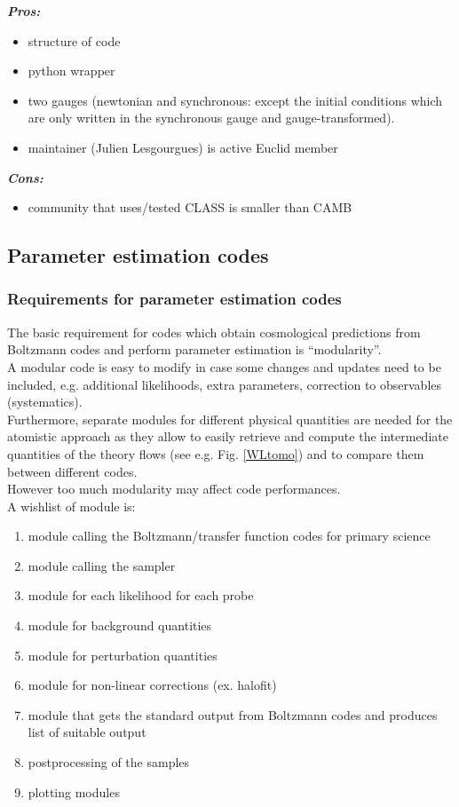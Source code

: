 {\it \bf Pros: }
\begin{itemize}
 \item structure of code
 \item python wrapper
 \item two gauges (newtonian and synchronous: except the initial conditions which are only written in the synchronous gauge and gauge-transformed). 
 \item maintainer (Julien Lesgourgues) is active Euclid member
\end{itemize}

{\it \bf Cons: }
\begin{itemize}
 \item community that uses/tested CLASS is smaller than CAMB
\end{itemize}


\newpage
\subsection{Parameter estimation codes}

\subsubsection{Requirements for parameter estimation codes}

The basic requirement for codes which obtain cosmological predictions from Boltzmann codes and perform parameter estimation is ``modularity''.\\
A modular code is easy to modify in case some changes and updates need to be included, e.g. additional likelihoods, extra parameters, correction to observables (systematics).\\
Furthermore, separate modules for different physical quantities are needed for the atomistic approach as they allow to easily retrieve and compute the intermediate quantities of the theory
flows (see e.g. Fig. \ref{WLtomo}) and to compare them between different codes.\\
However too much modularity may affect code performances.\\

A wishlist of module is:
\begin{enumerate}
 \item module calling the Boltzmann/transfer function codes for primary science
 \item module calling the sampler
 \item module for each likelihood for each probe
 \item module for background quantities
 \item module for perturbation quantities
 \item module for non-linear corrections (ex. halofit)
 \item module that gets the standard output from Boltzmann codes and produces list of suitable output
 \item postprocessing of the samples
 \item plotting modules 
\end{enumerate}

